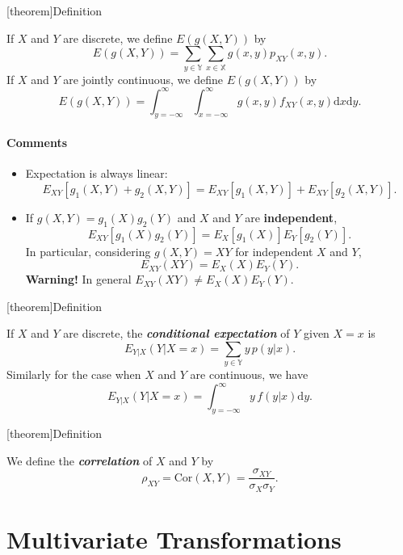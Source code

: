 \documentclass[12pt]{report}
\theoremstyle{definition}
\begin{document}
[theorem]{Definition}
\begin{expectations of two RV}
    If $X$ and $Y$ are discrete, we define $E(g(X,Y))$ by
    \[
        E(g(X,Y))=\sum_{y\in\mathbb{Y}}\sum_{x\in\mathbb{X}}g(x,y)p_{XY}(x,y).
    \]
    If $X$ and $Y$ are jointly continuous, we define $E(g(X,Y))$ by
    \[
        E(g(X,Y))=\int_{y=-\infty}^{\infty} \int_{x=-\infty}^{\infty}
        g(x,y)f_{XY}(x,y)\mathrm{d}x\mathrm{d}y.
    \]
\end{expectations of two RV}
\paragraph{Comments}
\begin{itemize}
    \item Expectation is always linear:
        \[
            E_{XY}[g_1(X,Y)+g_2(X,Y)]=E_{XY}[g_1(X,Y)]+E_{XY}[g_2(X,Y)].
        \]
    \item If $g(X,Y)=g_1(X)g_2(Y)$ and $X$ and $Y$ are \textbf{independent},
        \[
            E_{XY}[g_1(X)g_2(Y)]=E_X[g_1(X)]E_Y[g_2(Y)].
        \]
        In particular, considering $g(X,Y)=XY$ for independent $X$ and $Y$,
        \[
            E_{XY}(XY)=E_X(X)E_Y(Y).
        \]
        \textbf{Warning!} In general $E_{XY}(XY)\neq E_X(X)E_Y(Y)$.
\end{itemize} 

[theorem]{Definition}
\begin{conditional expectation}
    If $X$ and $Y$ are discrete,
    the \textbf{\emph{conditional expectation}} of $Y$ given $X=x$ is
    \[
        E_{Y|X}(Y|X=x)=\sum_{y\in\mathbb{Y}}y\,p(y|x).
    \]
    Similarly for the case when $X$ and $Y$ are continuous, we have
    \[
        E_{Y|X}(Y|X=x)=\int_{y=-\infty}^{\infty}y\,f(y|x)\mathrm{d}y. 
    \]
\end{conditional expectation}

[theorem]{Definition}
\begin{correlation of two RV}
    We define the \textbf{\emph{correlation}} of $X$ and $Y$ by
    \[
        \rho_{XY}=\text{Cor}(X,Y)=\frac{\sigma_{XY}}{\sigma_X\sigma_Y}.
    \]
\end{correlation of two RV}

\section{Multivariate Transformations}
\end{document}

